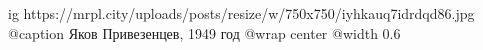  
 
 
 
 

\ifcmt
  ig https://mrpl.city/uploads/posts/resize/w/750x750/iyhkauq7idrdqd86.jpg
	@caption Яков Привезенцев, 1949 год
  @wrap center
  @width 0.6
\fi
